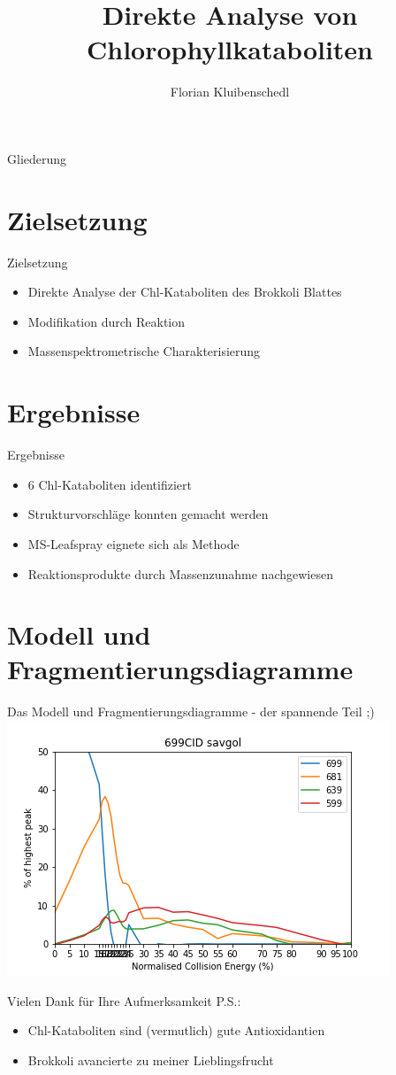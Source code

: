 \documentclass[12pt]{beamer}
\author{Florian Kluibenschedl}
\title{Direkte Analyse von Chlorophyllkataboliten}
\institute{8a - BRG Telfs}
\begin{document}
\begin{frame}
\titlepage
\end{frame}

\begin{frame}{Gliederung}
\tableofcontents
\end{frame}

\section{Zielsetzung}

\begin{frame}{Zielsetzung}
 \begin{itemize}
 \item Direkte Analyse der Chl-Kataboliten des Brokkoli Blattes
 \item Modifikation durch Reaktion
 \item Massenspektrometrische Charakterisierung
 \end{itemize}
\end{frame}

\section{Ergebnisse}

\begin{frame}{Ergebnisse}
 \begin{itemize}
 \item 6 Chl-Kataboliten identifiziert
 \item Strukturvorschläge konnten gemacht werden
 \item MS-Leafspray eignete sich als Methode
 \item Reaktionsprodukte durch Massenzunahme nachgewiesen
 \end{itemize}
\end{frame}

\section{Modell und Fragmentierungsdiagramme}

\begin{frame}{Das Modell und Fragmentierungsdiagramme - der spannende Teil ;)}
 \includegraphics[scale=0.65]{699CID-savgol1.png}
\end{frame}

\begin{frame}{Vielen Dank für Ihre Aufmerksamkeit}
P.S.:
 \begin{itemize}
 \item Chl-Kataboliten sind (vermutlich) gute Antioxidantien
 \item Brokkoli avancierte zu meiner Lieblingsfrucht
 \end{itemize}
\end{frame}
\end{document}
